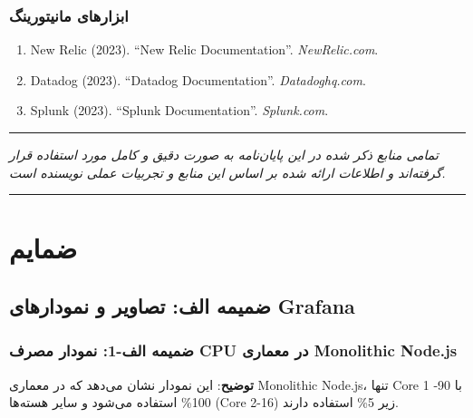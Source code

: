 \documentclass[
]{article}
\begin{document}
\subsubsection{ابزارهای
مانیتورینگ}\label{ux627ux628ux632ux627ux631ux647ux627ux6cc-ux645ux627ux646ux6ccux62aux648ux631ux6ccux646ux6af-1}

\begin{enumerate}
\def\labelenumi{\arabic{enumi}.}
\setcounter{enumi}{87}
\item
  New Relic (2023). ``New Relic Documentation''. \emph{NewRelic.com}.
\item
  Datadog (2023). ``Datadog Documentation''. \emph{Datadoghq.com}.
\item
  Splunk (2023). ``Splunk Documentation''. \emph{Splunk.com}.
\end{enumerate}

\begin{center}\rule{0.5\linewidth}{0.5pt}\end{center}

\emph{تمامی منابع ذکر شده در این پایان‌نامه به صورت دقیق و کامل مورد
استفاده قرار گرفته‌اند و اطلاعات ارائه شده بر اساس این منابع و تجربیات
عملی نویسنده است.}

\begin{center}\rule{0.5\linewidth}{0.5pt}\end{center}

\section{ضمایم}\label{ux636ux645ux627ux6ccux645}

\subsection{ضمیمه الف: تصاویر و نمودارهای
Grafana}\label{ux636ux645ux6ccux645ux647-ux627ux644ux641-ux62aux635ux627ux648ux6ccux631-ux648-ux646ux645ux648ux62fux627ux631ux647ux627ux6cc-grafana}

\subsubsection{ضمیمه الف-1: نمودار مصرف CPU در معماری Monolithic
Node.js}\label{ux636ux645ux6ccux645ux647-ux627ux644ux641-1-ux646ux645ux648ux62fux627ux631-ux645ux635ux631ux641-cpu-ux62fux631-ux645ux639ux645ux627ux631ux6cc-monolithic-node.js}

\textbf{توضیح}: این نمودار نشان می‌دهد که در معماری Monolithic Node.js،
تنها Core 1 با 90-100\% استفاده می‌شود و سایر هسته‌ها (Core 2-16) زیر 5\%
استفاده دارند.
\end{document}
